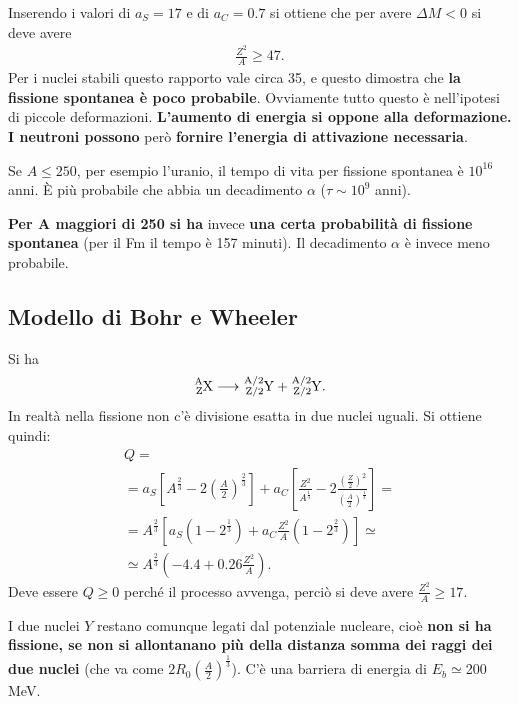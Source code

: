 \documentclass[a4paper,11pt,twoside,openany]{book}
\theoremstyle{definition}
\theoremstyle{plain}
\theoremstyle{plain}
\theoremstyle{definition}
\begin{document}
Inserendo i valori di $a_S=17$ e di $a_C=0.7$ si ottiene che per avere $\Delta M<0$ si deve avere
\begin{equation}\begin{split}
\frac{Z^2}{A}\ge 47.
\end{split}\end{equation}
Per i nuclei stabili questo rapporto vale circa 35, e questo dimostra che \textbf{la fissione spontanea è poco probabile}. Ovviamente tutto questo è nell'ipotesi di piccole deformazioni. \textbf{L'aumento di energia si oppone alla deformazione. I neutroni possono} però \textbf{fornire l'energia di attivazione necessaria}.

Se $A\le 250$, per esempio l'uranio, il tempo di vita per fissione spontanea è $10^{16}$ anni. È più probabile che abbia un decadimento $\alpha$ ($\tau\sim 10^9$ anni).

\textbf{Per A maggiori di 250 si ha} invece \textbf{una certa probabilità di fissione spontanea} (per il \si{Fm} il tempo è 157 minuti). Il decadimento $\alpha$ è invece meno probabile.

\subsection{Modello di Bohr e Wheeler} %
Si ha $$\ce{^{A}_ZX}\longrightarrow\ce{^{A/2}_{Z/2}Y}+\ce{^{A/2}_{Z/2}Y}.$$ In realtà nella fissione non c'è divisione esatta in due nuclei uguali. Si ottiene quindi:
\begin{equation}\begin{split}
Q=\\
=a_S\left[A^{\frac{2}{3}}-2\left(\frac{A}{2}\right)^{\frac{2}{3}}\right]+a_C\left[\frac{Z^2}{A^{\frac{1}{3}}}-2\frac{\left(\frac{Z}{2}\right)^2}{\left(\frac{A}{2}\right)^{\frac{1}{3}}}\right]=\\
=A^{\frac{2}{3}}\left[a_S\left(1-2^{\frac{1}{3}}\right)+a_C\frac{Z^2}{A}\left(1-2^{\frac{2}{3}}\right)\right]\simeq\\
\simeq A^{\frac{2}{3}}\left(-4.4+0.26\frac{Z^2}{A}\right).
\end{split}\end{equation}
Deve essere $Q\ge 0$ perché il processo avvenga, perciò si deve avere $\frac{Z^2}{A}\ge 17$.

I due nuclei $Y$ restano comunque legati dal potenziale nucleare, cioè \textbf{non si ha fissione, se non si allontanano più della distanza somma dei raggi dei due nuclei} (che va come $2R_0\left(\frac{A}{2}\right)^{\frac{1}{3}}$). C'è una barriera di energia di $E_b\simeq$200 MeV.
\end{document}
